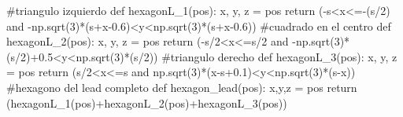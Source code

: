 \documentclass[
  letterpaper,
  DIV=11,
  numbers=noendperiod]{scrreprt}
\newenvironment{Shaded}{\begin{snugshade}}{\end{snugshade}}
\newcommand{\CommentTok}[1]{\textcolor[rgb]{0.37,0.37,0.37}{#1}}
\newcommand{\ControlFlowTok}[1]{\textcolor[rgb]{0.00,0.23,0.31}{#1}}
\newcommand{\DecValTok}[1]{\textcolor[rgb]{0.68,0.00,0.00}{#1}}
\newcommand{\FloatTok}[1]{\textcolor[rgb]{0.68,0.00,0.00}{#1}}
\newcommand{\KeywordTok}[1]{\textcolor[rgb]{0.00,0.23,0.31}{#1}}
\newcommand{\NormalTok}[1]{\textcolor[rgb]{0.00,0.23,0.31}{#1}}
\newcommand{\OperatorTok}[1]{\textcolor[rgb]{0.37,0.37,0.37}{#1}}
\begin{document}
\begin{Shaded}
\begin{Highlighting}[]
    \CommentTok{\#triangulo izquierdo}
    \KeywordTok{def}\NormalTok{ hexagonL\_1(pos):}
\NormalTok{        x, y, z }\OperatorTok{=}\NormalTok{ pos }
        \ControlFlowTok{return}\NormalTok{ (}\OperatorTok{{-}}\NormalTok{s}\OperatorTok{\textless{}}\NormalTok{x}\OperatorTok{\textless{}={-}}\NormalTok{(s}\OperatorTok{/}\DecValTok{2}\NormalTok{) }\KeywordTok{and} \OperatorTok{{-}}\NormalTok{np.sqrt(}\DecValTok{3}\NormalTok{)}\OperatorTok{*}\NormalTok{(s}\OperatorTok{+}\NormalTok{x}\OperatorTok{{-}}\FloatTok{0.6}\NormalTok{)}\OperatorTok{\textless{}}\NormalTok{y}\OperatorTok{\textless{}}\NormalTok{np.sqrt(}\DecValTok{3}\NormalTok{)}\OperatorTok{*}\NormalTok{(s}\OperatorTok{+}\NormalTok{x}\OperatorTok{{-}}\FloatTok{0.6}\NormalTok{))}
    \CommentTok{\#cuadrado en el centro}
    \KeywordTok{def}\NormalTok{ hexagonL\_2(pos):}
\NormalTok{        x, y, z }\OperatorTok{=}\NormalTok{ pos }
        \ControlFlowTok{return}\NormalTok{ (}\OperatorTok{{-}}\NormalTok{s}\OperatorTok{/}\DecValTok{2}\OperatorTok{\textless{}}\NormalTok{x}\OperatorTok{\textless{}=}\NormalTok{s}\OperatorTok{/}\DecValTok{2} \KeywordTok{and} \OperatorTok{{-}}\NormalTok{np.sqrt(}\DecValTok{3}\NormalTok{)}\OperatorTok{*}\NormalTok{(s}\OperatorTok{/}\DecValTok{2}\NormalTok{)}\OperatorTok{+}\FloatTok{0.5}\OperatorTok{\textless{}}\NormalTok{y}\OperatorTok{\textless{}}\NormalTok{np.sqrt(}\DecValTok{3}\NormalTok{)}\OperatorTok{*}\NormalTok{(s}\OperatorTok{/}\DecValTok{2}\NormalTok{))}
    \CommentTok{\#triangulo derecho }
    \KeywordTok{def}\NormalTok{ hexagonL\_3(pos):}
\NormalTok{        x, y, z }\OperatorTok{=}\NormalTok{ pos }
        \ControlFlowTok{return}\NormalTok{ (s}\OperatorTok{/}\DecValTok{2}\OperatorTok{\textless{}}\NormalTok{x}\OperatorTok{\textless{}=}\NormalTok{s }\KeywordTok{and}\NormalTok{ np.sqrt(}\DecValTok{3}\NormalTok{)}\OperatorTok{*}\NormalTok{(x}\OperatorTok{{-}}\NormalTok{s}\OperatorTok{+}\FloatTok{0.1}\NormalTok{)}\OperatorTok{\textless{}}\NormalTok{y}\OperatorTok{\textless{}}\NormalTok{np.sqrt(}\DecValTok{3}\NormalTok{)}\OperatorTok{*}\NormalTok{(s}\OperatorTok{{-}}\NormalTok{x))}
    \CommentTok{\#hexagono del lead completo}
    \KeywordTok{def}\NormalTok{ hexagon\_lead(pos):}
\NormalTok{        x,y,z }\OperatorTok{=}\NormalTok{ pos }
        \ControlFlowTok{return}\NormalTok{ (hexagonL\_1(pos)}\OperatorTok{+}\NormalTok{hexagonL\_2(pos)}\OperatorTok{+}\NormalTok{hexagonL\_3(pos))}


\end{Highlighting}
\end{Shaded}
\end{document}
